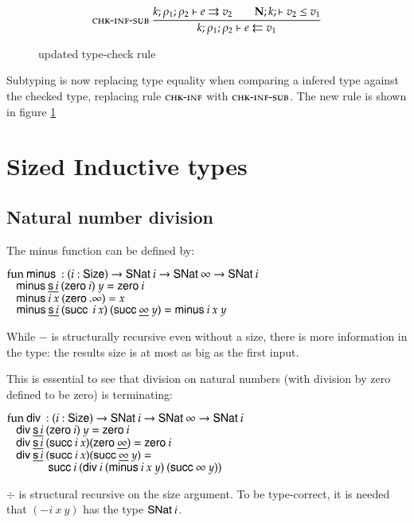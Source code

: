 \begin{figure}

\begin{gather*}
\mbox{\sc chk-inf-sub}\ \dfrac{k;\rho_1;\rho_2\vdash e\rightrightarrows v_2
\qquad
{\mathbf{N};k;\vdash v_2\leq v_1}}{k;\rho_1;\rho_2\vdash e\leftleftarrows v_1}
\end{gather*}
\caption{updated type-check rule}
\label{news}
\end{figure}

Subtyping is now replacing type equality when comparing a infered type against the checked type,
replacing rule $\mbox{\sc chk-inf}$ with $\mbox{\sc chk-inf-sub}$.
The new rule is shown in figure \ref{news}


\section{Sized Inductive types }

\subsection{Natural number division}

The minus function can be defined by:
\begin{bsp}
$\mathrm{fun}\: \mathsf{minus}\: : (i : \mathsf{Size} ) \rightarrow \mathsf{SNat}\: i \rightarrow \mathsf{SNat}\: \infty \rightarrow \mathsf{SNat}\: i$\\
$\hspace*{3mm} \mathsf{minus}\: \underline{\mathsf{s}\, i} \: (\mathsf{zero}\: i) \:  y = \mathsf{zero}\: i $ \\
$\hspace*{3mm} \mathsf{minus}\: i \: x \: (\mathsf{zero}\: .\infty)  = x $\\
$\hspace*{3mm} \mathsf{minus}\: \underline{\mathsf{s}\, i} \: (\mathsf{succ}\: \: i \: x) \: (\mathsf{succ}\: \underline{\infty} \: y) = \mathsf{minus}\: i \: x \: y $
\end{bsp}
While $\minus$ is structurally recursive even without a size, 
there is more information in the type: the results size is at most as big as the first input.

This is essential to see that division on natural numbers (with division by zero defined to be zero) 
is terminating:
\begin{bsp}
$\mathrm{fun}\: \mathsf{div}\: : ( i : \mathsf{Size} )  \rightarrow  \mathsf{SNat}\: i \rightarrow \mathsf{SNat}\: \infty \rightarrow \mathsf{SNat}\: i$\\
$\hspace*{3mm} \mathsf{div}\: \underline{\mathsf{s}\, i} \: (\mathsf{zero}\: i) \: y = \mathsf{zero}\: i$\\
$\hspace*{3mm} \mathsf{div}\: \underline{\mathsf{s}\, i} \: (\mathsf{succ}\: i \: x) (\mathsf{zero}\: \underline{\infty})  = \mathsf{zero}\: i$\\
$\hspace*{3mm} \mathsf{div}\: \underline{\mathsf{s}\, i} \: (\mathsf{succ}\: i \: x) (\mathsf{succ}\: \underline{\infty} \: y) = $\\
$\spc \spcx \suc i \: (\div i \: (\minus i \: x \:y) \: (\suc \infty \: y))$
\end{bsp}
$\div$ is structural recursive on the size argument.
To be type-correct, it is needed that $(\minus i \: x \:y)$ has the type $\mathsf{SNat}\: i$.

